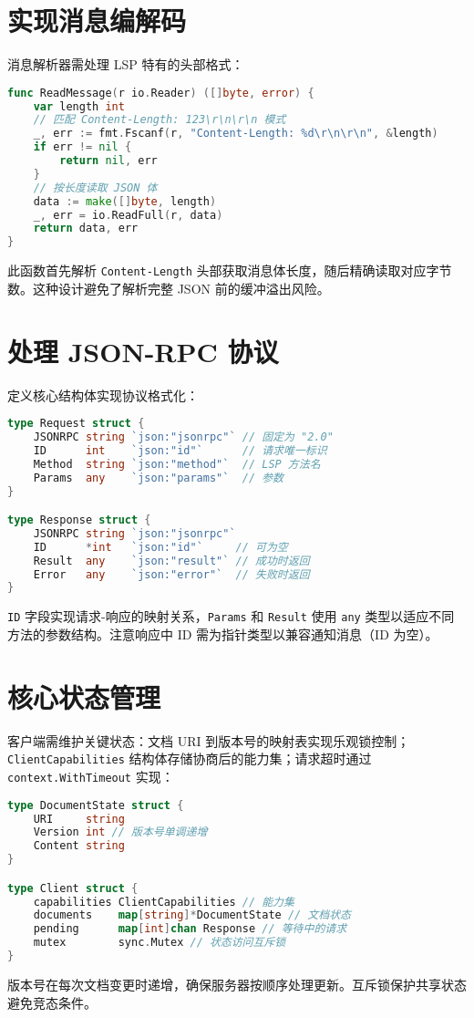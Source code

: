 \section{实现消息编解码}
消息解析器需处理 LSP 特有的头部格式：\par
\begin{lstlisting}[language=go]
func ReadMessage(r io.Reader) ([]byte, error) {
    var length int
    // 匹配 Content-Length: 123\r\n\r\n 模式
    _, err := fmt.Fscanf(r, "Content-Length: %d\r\n\r\n", &length)
    if err != nil {
        return nil, err
    }
    // 按长度读取 JSON 体
    data := make([]byte, length)
    _, err = io.ReadFull(r, data)
    return data, err
}
\end{lstlisting}
此函数首先解析 \texttt{Content-Length} 头部获取消息体长度，随后精确读取对应字节数。这种设计避免了解析完整 JSON 前的缓冲溢出风险。\par
\section{处理 JSON-RPC 协议}
定义核心结构体实现协议格式化：\par
\begin{lstlisting}[language=go]
type Request struct {
    JSONRPC string `json:"jsonrpc"` // 固定为 "2.0"
    ID      int    `json:"id"`      // 请求唯一标识
    Method  string `json:"method"`  // LSP 方法名
    Params  any    `json:"params"`  // 参数
}

type Response struct {
    JSONRPC string `json:"jsonrpc"`
    ID      *int   `json:"id"`     // 可为空
    Result  any    `json:"result"` // 成功时返回
    Error   any    `json:"error"`  // 失败时返回
}
\end{lstlisting}
\texttt{ID} 字段实现请求-响应的映射关系，\texttt{Params} 和 \texttt{Result} 使用 \texttt{any} 类型以适应不同方法的参数结构。注意响应中 ID 需为指针类型以兼容通知消息（ID 为空）。\par
\section{核心状态管理}
客户端需维护关键状态：文档 URI 到版本号的映射表实现乐观锁控制；\texttt{ClientCapabilities} 结构体存储协商后的能力集；请求超时通过 \texttt{context.WithTimeout} 实现：\par
\begin{lstlisting}[language=go]
type DocumentState struct {
    URI     string
    Version int // 版本号单调递增
    Content string
}

type Client struct {
    capabilities ClientCapabilities // 能力集
    documents    map[string]*DocumentState // 文档状态
    pending      map[int]chan Response // 等待中的请求
    mutex        sync.Mutex // 状态访问互斥锁
}
\end{lstlisting}
版本号在每次文档变更时递增，确保服务器按顺序处理更新。互斥锁保护共享状态避免竞态条件。\par
